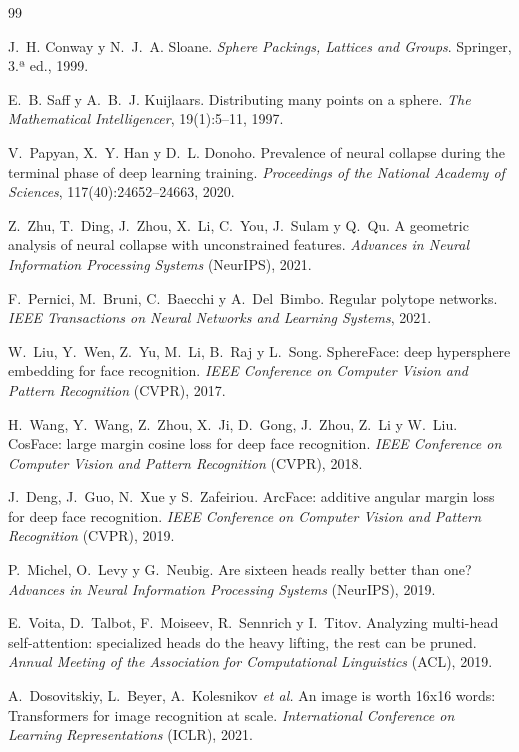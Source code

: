 \documentclass[11pt,a4paper]{article}
\theoremstyle{plain}
\begin{document}
\begin{thebibliography}{99}

J.~H. Conway y N.~J.~A. Sloane.
\emph{Sphere Packings, Lattices and Groups}.
Springer, 3.ª ed., 1999.

E.~B. Saff y A.~B.~J. Kuijlaars.
Distributing many points on a sphere.
\emph{The Mathematical Intelligencer}, 19(1):5--11, 1997.

V.~Papyan, X.~Y. Han y D.~L. Donoho.
Prevalence of neural collapse during the terminal phase of deep
learning training.
\emph{Proceedings of the National Academy of Sciences},
117(40):24652--24663, 2020.

Z.~Zhu, T.~Ding, J.~Zhou, X.~Li, C.~You, J.~Sulam y Q.~Qu.
A geometric analysis of neural collapse with unconstrained features.
\emph{Advances in Neural Information Processing Systems} (NeurIPS), 2021.

F.~Pernici, M.~Bruni, C.~Baecchi y A.~Del~Bimbo.
Regular polytope networks.
\emph{IEEE Transactions on Neural Networks and Learning Systems}, 2021.

W.~Liu, Y.~Wen, Z.~Yu, M.~Li, B.~Raj y L.~Song.
SphereFace: deep hypersphere embedding for face recognition.
\emph{IEEE Conference on Computer Vision and Pattern Recognition}
(CVPR), 2017.

H.~Wang, Y.~Wang, Z.~Zhou, X.~Ji, D.~Gong, J.~Zhou, Z.~Li y W.~Liu.
CosFace: large margin cosine loss for deep face recognition.
\emph{IEEE Conference on Computer Vision and Pattern Recognition}
(CVPR), 2018.

J.~Deng, J.~Guo, N.~Xue y S.~Zafeiriou.
ArcFace: additive angular margin loss for deep face recognition.
\emph{IEEE Conference on Computer Vision and Pattern Recognition}
(CVPR), 2019.

P.~Michel, O.~Levy y G.~Neubig.
Are sixteen heads really better than one?
\emph{Advances in Neural Information Processing Systems} (NeurIPS), 2019.

E.~Voita, D.~Talbot, F.~Moiseev, R.~Sennrich y I.~Titov.
Analyzing multi-head self-attention: specialized heads do the heavy
lifting, the rest can be pruned.
\emph{Annual Meeting of the Association for Computational Linguistics}
(ACL), 2019.

A.~Dosovitskiy, L.~Beyer, A.~Kolesnikov \emph{et al.}
An image is worth 16x16 words: Transformers for image recognition at
scale.
\emph{International Conference on Learning Representations} (ICLR), 2021.


\end{thebibliography}
\end{document}
